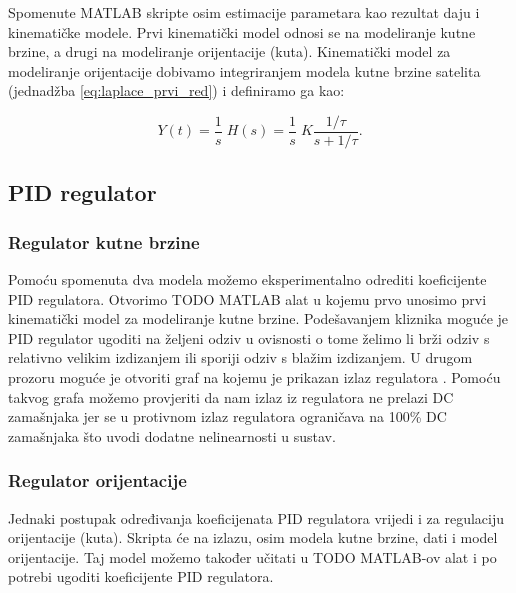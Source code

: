 \documentclass[times, utf8, diplomski, numeric]{templates/template}
\begin{document}
{{{            Spomenute MATLAB skripte osim estimacije parametara kao rezultat daju i kinematičke modele. Prvi kinematički model odnosi se na modeliranje kutne brzine, a drugi na modeliranje orijentacije (kuta). Kinematički model za modeliranje orijentacije dobivamo integriranjem modela kutne brzine satelita (jednadžba \ref{eq:laplace_prvi_red}) i definiramo ga kao:

            \begin{equation}
                Y(t) = \frac{1}{s} \; H(s) =  \frac{1}{s} \; K \frac{1/\tau}{s + 1/\tau}.
            \end{equation}
        }
    
        \subsection{PID regulator}{
            \subsubsection{Regulator kutne brzine}{
                Pomoću spomenuta dva modela možemo eksperimentalno odrediti koeficijente PID regulatora. Otvorimo TODO MATLAB alat u kojemu prvo unosimo prvi kinematički model za modeliranje kutne brzine. Podešavanjem kliznika moguće je PID regulator ugoditi na željeni odziv u ovisnosti o tome želimo li brži odziv s relativno velikim izdizanjem  ili sporiji odziv s blažim izdizanjem. U drugom prozoru moguće je otvoriti graf na kojemu je prikazan izlaz regulatora . Pomoću takvog grafa možemo provjeriti da nam izlaz iz regulatora ne prelazi DC zamašnjaka jer se u protivnom izlaz regulatora ograničava na 100\% DC zamašnjaka što uvodi dodatne nelinearnosti u sustav. 
            }

            \subsubsection{Regulator orijentacije}{
                Jednaki postupak određivanja koeficijenata PID regulatora vrijedi i za regulaciju orijentacije (kuta). Skripta će na izlazu, osim modela kutne brzine, dati i model orijentacije. Taj model možemo također učitati u TODO MATLAB-ov alat i po potrebi ugoditi koeficijente PID regulatora.
            }
        }
    }

}
\end{document}
